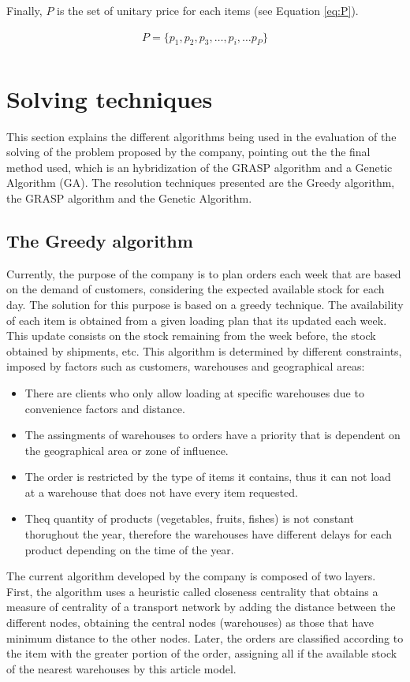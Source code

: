 \documentclass[letterpaper]{article} %
\begin{document}
Finally, $P$ is the set of unitary price for each items (see Equation \ref{eq:P}).

\begin{equation}
    \begin{aligned}\label{eq:P}
        P = \{p_1, p_2, p_3, \dots, p_i, \dots p_P \}\\
    \end{aligned}
\end{equation}


\section*{Solving techniques}

This section explains the different algorithms being used in the evaluation of the solving of the problem proposed by the company, pointing out the the final method used, which is an hybridization of the GRASP algorithm and a Genetic Algorithm (GA). The resolution techniques presented are the Greedy algorithm, the GRASP algorithm and the Genetic Algorithm.

\subsection*{The Greedy algorithm }
Currently, the purpose of the company is to plan orders each week that are based on the demand of customers, considering the expected available stock for each day. The solution for this purpose is based on a greedy technique. The availability of each item is obtained from a given loading plan that its updated each week. This update consists on the stock remaining from the week before, the stock obtained by shipments, etc. This algorithm is determined by different constraints, imposed by factors such as customers, warehouses and geographical areas:

\begin{itemize}
    \item There are clients who only allow loading at specific warehouses due to convenience factors and distance.
    \item The assingments of warehouses to orders have a priority that is dependent on the geographical area or zone of influence.
    \item The order is restricted by the type of items it contains, thus it can not load at a warehouse that does not have every item requested.
    \item Theq quantity of products (vegetables, fruits, fishes) is not constant thorughout the year, therefore the warehouses have different delays for each product depending on the time of the year.
\end{itemize}
The current algorithm developed by the company is composed of two layers. First, the algorithm uses a heuristic called closeness centrality that obtains a measure of centrality of a transport network by adding the distance between the different nodes, obtaining the central nodes (warehouses) as those that have minimum distance to the other nodes. Later, the orders are classified according to the item with the greater portion of the order, assigning all if the available stock of the nearest warehouses by this article model.
\end{document}
